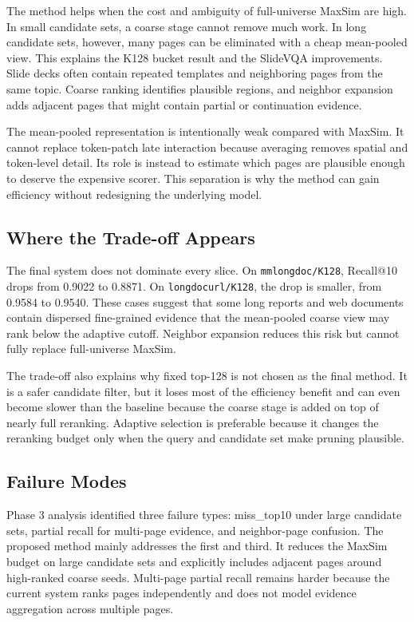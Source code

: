 \documentclass[11pt]{article}
\begin{document}
The method helps when the cost and ambiguity of full-universe MaxSim are high. In small candidate sets, a coarse stage cannot remove much work. In long candidate sets, however, many pages can be eliminated with a cheap mean-pooled view. This explains the K128 bucket result and the SlideVQA improvements. Slide decks often contain repeated templates and neighboring pages from the same topic. Coarse ranking identifies plausible regions, and neighbor expansion adds adjacent pages that might contain partial or continuation evidence.

The mean-pooled representation is intentionally weak compared with MaxSim. It cannot replace token-patch late interaction because averaging removes spatial and token-level detail. Its role is instead to estimate which pages are plausible enough to deserve the expensive scorer. This separation is why the method can gain efficiency without redesigning the underlying model.

\subsection{Where the Trade-off Appears}

The final system does not dominate every slice. On \texttt{mmlongdoc/K128}, Recall@10 drops from 0.9022 to 0.8871. On \texttt{longdocurl/K128}, the drop is smaller, from 0.9584 to 0.9540. These cases suggest that some long reports and web documents contain dispersed fine-grained evidence that the mean-pooled coarse view may rank below the adaptive cutoff. Neighbor expansion reduces this risk but cannot fully replace full-universe MaxSim.

The trade-off also explains why fixed top-128 is not chosen as the final method. It is a safer candidate filter, but it loses most of the efficiency benefit and can even become slower than the baseline because the coarse stage is added on top of nearly full reranking. Adaptive selection is preferable because it changes the reranking budget only when the query and candidate set make pruning plausible.

\subsection{Failure Modes}

Phase 3 analysis identified three failure types: miss\_top10 under large candidate sets, partial recall for multi-page evidence, and neighbor-page confusion. The proposed method mainly addresses the first and third. It reduces the MaxSim budget on large candidate sets and explicitly includes adjacent pages around high-ranked coarse seeds. Multi-page partial recall remains harder because the current system ranks pages independently and does not model evidence aggregation across multiple pages.
\end{document}
